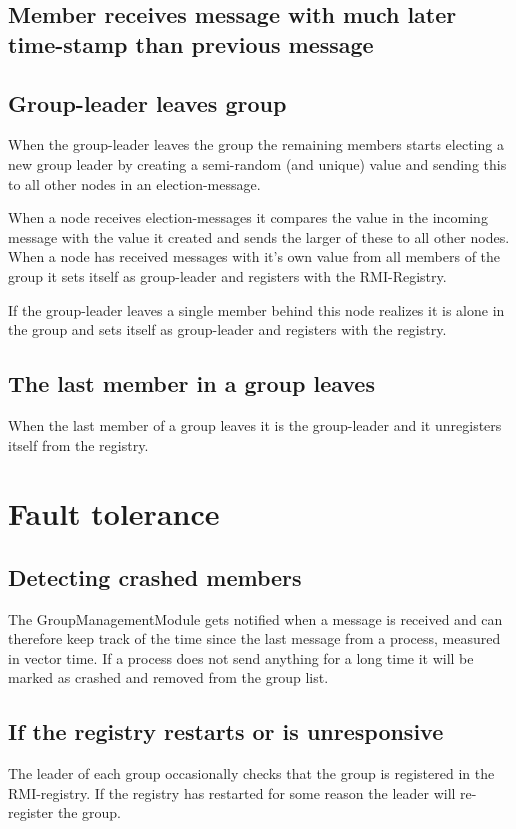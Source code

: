 \documentclass[11pt,swedish]{article}
\begin{document}
\subsection{Member receives message with much later time-stamp than previous message}

\subsection{Group-leader leaves group}
When the group-leader leaves the group the remaining members starts electing a new group leader by creating a semi-random (and unique) value and sending this to all other nodes in an election-message.

When a node receives election-messages it compares the value in the incoming message with the value it created and sends the larger of these to all other nodes. When a node has received messages with it's own value from all members of the group it sets itself as group-leader and registers with the RMI-Registry.

If the group-leader leaves a single member behind this node realizes it is alone in the group and sets itself as group-leader and registers with the registry.

\subsection{The last member in a group leaves}
When the last member of a group leaves it is the group-leader and it unregisters itself from the registry.

\section{Fault tolerance}

\subsection{Detecting crashed members}
The GroupManagementModule gets notified when a message is received and can therefore keep track of the time since the last message from a process, measured in vector time. If a process does not send anything for a long time it will be marked as crashed and removed from the group list.

\subsection{If the registry restarts or is unresponsive}
The leader of each group occasionally checks that the group is registered in the RMI-registry. If the registry has restarted for some reason the leader will re-register the group.
\end{document}
